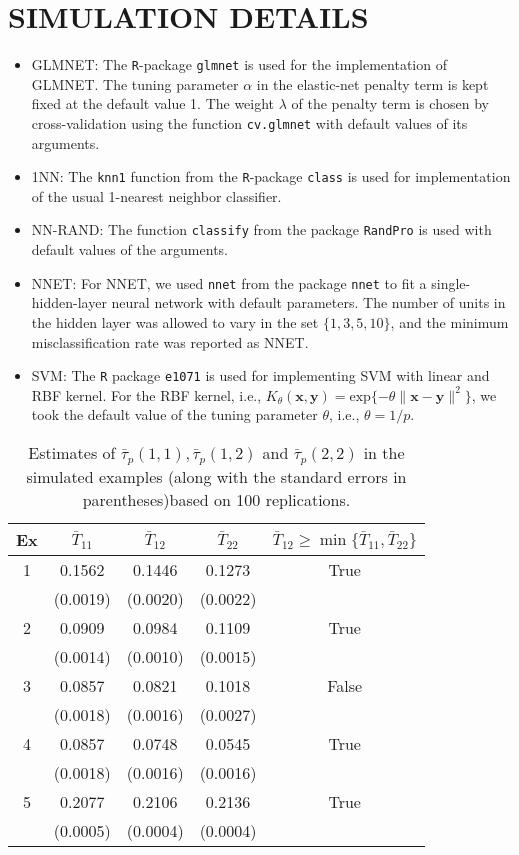 \documentclass[twoside]{article}
\newcommand{\bx}{\mathbf{x}}
\newcommand{\by}{\mathbf{y}}
\newcommand{\0}{\mathbf{0}}
\newcommand{\1}{\mathbf{1}}
\numberwithin{equation}{section}
\begin{document}
\section*{SIMULATION DETAILS}
\begin{itemize}
 \item GLMNET: The {\tt R}-package {\tt glmnet} is used for the implementation of GLMNET. The tuning parameter $\alpha$ in the elastic-net penalty term is kept fixed at the default value 1. The weight $\lambda$ of the penalty term is chosen by cross-validation using the function {\tt cv.glmnet} with default values of its arguments.
 \item 1NN: The {\tt knn1} function from the {\tt R}-package {\tt class} is used for implementation of the usual 1-nearest neighbor classifier.
 \item NN-RAND: The function {\tt classify} from the package {\tt RandPro} is used with default values of the arguments.
 \item NNET: For NNET, we used {\tt nnet} from the package {\tt nnet} to fit a single-hidden-layer neural network with default parameters. The number of units in the hidden layer was allowed to vary in the set $\{1,3,5,10\}$, and the minimum misclassification rate was reported as NNET.
 \item SVM: The {\tt R} package {\tt e1071} is used for implementing SVM with linear and RBF kernel. For the RBF kernel, i.e., $K_\theta(\bx,\by)=\mathrm{exp}\{-\theta\|\bx-\by\|^2\}$, we took the default value of the tuning parameter $\theta$, i.e., $\theta=1/p$.
\end{itemize}
\begin{table}[H]
\caption{Estimates of $\bar{\tau}_p(1,1),\bar{\tau}_p(1,2)$ and $\bar{\tau}_p(2,2)$ in the simulated examples (along with the standard errors in parentheses)based on 100 replications.}\label{tab3}
\small
\centering
\begin{tabular}{|c|c|c|c|c|}
\hline
\textbf{Ex}  &$\bar{T}_{11}$& $\bar{T}_{12}$&$\bar{T}_{22}$&$\bar{T}_{12}\geq \min\{\bar{T}_{11},\bar{T}_{22}\}$\\
\hline
1 & 0.1562 & 0.1446 & 0.1273 & True \\
    & (0.0019) & (0.0020) & (0.0022)& \\ \hline
2 & 0.0909 & 0.0984 & 0.1109& True \\
    & (0.0014) & (0.0010) & (0.0015)& \\ \hline
3 & 0.0857 & 0.0821 & 0.1018 & False\\
    & (0.0018) & (0.0016) & (0.0027)& \\ \hline
4 & 0.0857 & 0.0748 & 0.0545 & True\\
    & (0.0018) & (0.0016) & (0.0016)& \\ \hline
5 & 0.2077 & 0.2106 & 0.2136 & True\\
    & (0.0005) & (0.0004) & (0.0004)& \\ \hline
\end{tabular}
\end{table}
\end{document}
